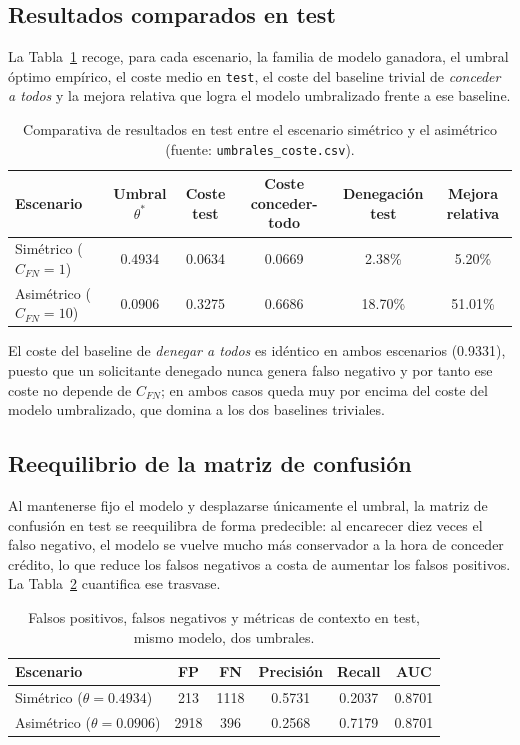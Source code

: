 \documentclass[11pt,a4paper]{article}
\begin{document}
\subsection*{Resultados comparados en test}

La Tabla~\ref{tab:comparativa-escenarios} recoge, para cada escenario, la familia de modelo ganadora,
el umbral óptimo empírico, el coste medio en \texttt{test}, el coste del baseline trivial de
\emph{conceder a todos} y la mejora relativa que logra el modelo umbralizado frente a ese baseline.

\begin{table}[H]
\centering
\caption{Comparativa de resultados en test entre el escenario simétrico y el asimétrico
(fuente: \texttt{umbrales\_coste.csv}).}
\label{tab:comparativa-escenarios}
\begin{tabular}{lccccc}
\toprule
Escenario & Umbral $\theta^{*}$ & Coste test & Coste conceder-todo & Denegación test & Mejora relativa \\
\midrule
Simétrico ($C_{FN}=1$)  & 0.4934 & 0.0634 & 0.0669 & 2.38\% & 5.20\% \\
Asimétrico ($C_{FN}=10$) & 0.0906 & 0.3275 & 0.6686 & 18.70\% & 51.01\% \\
\bottomrule
\end{tabular}
\end{table}

El coste del baseline de \emph{denegar a todos} es idéntico en ambos escenarios (0.9331), puesto que un
solicitante denegado nunca genera falso negativo y por tanto ese coste no depende de $C_{FN}$; en ambos
casos queda muy por encima del coste del modelo umbralizado, que domina a los dos baselines triviales.

\subsection*{Reequilibrio de la matriz de confusión}

Al mantenerse fijo el modelo y desplazarse únicamente el umbral, la matriz de confusión en test se
reequilibra de forma predecible: al encarecer diez veces el falso negativo, el modelo se vuelve mucho
más conservador a la hora de conceder crédito, lo que reduce los falsos negativos a costa de aumentar
los falsos positivos. La Tabla~\ref{tab:confusion-comparativa} cuantifica ese trasvase.

\begin{table}[H]
\centering
\caption{Falsos positivos, falsos negativos y métricas de contexto en test, mismo modelo, dos umbrales.}
\label{tab:confusion-comparativa}
\begin{tabular}{lccccc}
\toprule
Escenario & FP & FN & Precisión & Recall & AUC \\
\midrule
Simétrico ($\theta=0.4934$)  & 213  & 1118 & 0.5731 & 0.2037 & 0.8701 \\
Asimétrico ($\theta=0.0906$) & 2918 & 396  & 0.2568 & 0.7179 & 0.8701 \\
\bottomrule
\end{tabular}
\end{table}
\end{document}

